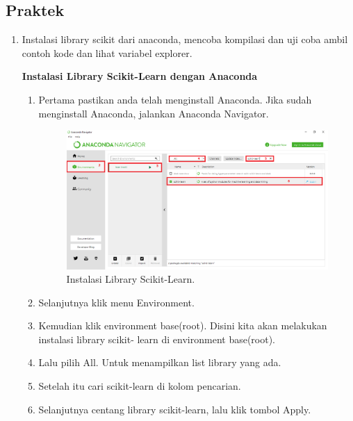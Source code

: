 \subsection{Praktek}
\begin{enumerate}
	\item Instalasi  library  scikit  dari  anaconda,  mencoba  kompilasi  dan  uji  coba  ambil contoh kode dan lihat variabel explorer.
	
	\textbf{Instalasi Library Scikit-Learn dengan Anaconda}
	\begin{enumerate}
		\item Pertama pastikan anda telah menginstall Anaconda. Jika sudah menginstall Anaconda, jalankan Anaconda Navigator.
		\begin{figure}[H]
			\includegraphics[width=1\textwidth]{figures/1174006/chapter1/praktek/install.png}
			\centering
			\caption{Instalasi Library Scikit-Learn.}
		\end{figure}
		\item Selanjutnya klik menu Environment.
		\item Kemudian klik environment base(root). Disini kita akan melakukan instalasi library scikit- learn di environment base(root).
		\item Lalu pilih All. Untuk menampilkan list library yang ada.
		\item Setelah itu cari scikit-learn di kolom pencarian.
		\item Selanjutnya centang library scikit-learn, lalu klik tombol Apply.
	\end{enumerate}


\end{enumerate}
